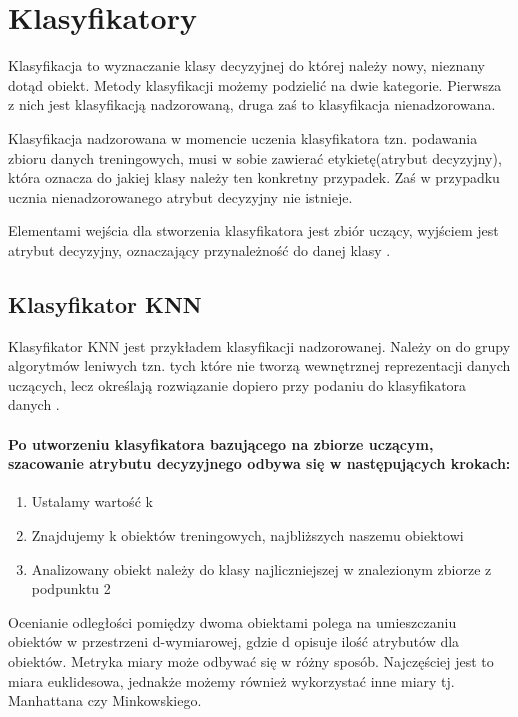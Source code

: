 \documentclass[a4paper,12pt,twoside,openany]{report}
\begin{document}
\section{Klasyfikatory}
Klasyfikacja to wyznaczanie klasy decyzyjnej do której należy nowy, nieznany dotąd obiekt. Metody klasyfikacji możemy podzielić na dwie kategorie. Pierwsza z nich jest  klasyfikacją nadzorowaną, druga zaś to klasyfikacja nienadzorowana. 

Klasyfikacja nadzorowana w momencie uczenia klasyfikatora tzn. podawania zbioru danych treningowych, musi w sobie zawierać etykietę(atrybut decyzyjny), która oznacza do jakiej klasy należy ten konkretny przypadek. Zaś w przypadku ucznia nienadzorowanego atrybut decyzyjny nie istnieje.

Elementami wejścia dla stworzenia klasyfikatora jest zbiór uczący, wyjściem jest atrybut decyzyjny, oznaczający przynależność do danej klasy \cite{Malina2}.

\subsection{Klasyfikator KNN}
Klasyfikator KNN jest przykładem klasyfikacji nadzorowanej. Należy on do grupy algorytmów leniwych tzn. tych które nie tworzą wewnętrznej reprezentacji danych uczących, lecz określają rozwiązanie dopiero przy podaniu do klasyfikatora danych \cite{knn2}.

\paragraph{Po utworzeniu klasyfikatora bazującego na zbiorze uczącym, szacowanie atrybutu decyzyjnego odbywa się w następujących krokach: }
\begin{enumerate}
	\item Ustalamy wartość k
	\item Znajdujemy k obiektów treningowych, najbliższych naszemu obiektowi
	\item Analizowany obiekt należy do klasy najliczniejszej w znalezionym zbiorze z podpunktu 2
\end{enumerate}

Ocenianie odległości pomiędzy dwoma obiektami polega na umieszczaniu obiektów w przestrzeni d-wymiarowej, gdzie d opisuje ilość atrybutów dla obiektów. Metryka miary może odbywać się w różny sposób. Najczęściej jest to miara euklidesowa, jednakże możemy również wykorzystać inne miary tj. Manhattana czy Minkowskiego. 
\end{document}
